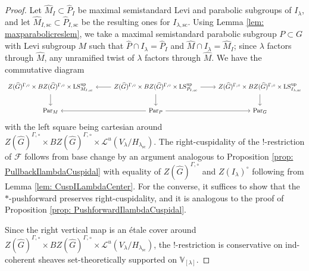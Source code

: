 \documentclass{amsart}
\theoremstyle{definition}
\theoremstyle{remark}
\numberwithin{equation}{section}
\newcommand{\mc}{\mathcal}
\newcommand{\Sc}{\mathrm{sc}}
\newcommand{\wh}{\widehat}
\newcommand{\Par}{\mathrm{Par}}
\newcommand{\V}{\mathbb{V}}
\newcommand{\up}{\mathrm{up}}
\newcommand{\LS}{\mathrm{LS}}
\begin{document}
\begin{proof}
Let $\wh M_{I}\subset \wh P_{I}$ be maximal semistandard Levi and parabolic subgroups of $I_{\lambda}$, and let $\wh M_{I, \Sc}\subset \wh P_{I, \Sc}$ be the resulting ones for $I_{\lambda, \Sc}$. Using Lemma \ref{lem: maxparabolicreslem}, we take a maximal semistandard parabolic subgroup $P\subset G$ with Levi subgroup $M$ such that $\wh P\cap I_\lambda=\wh P_I$ and $\wh M\cap I_\lambda=\wh M_I$; since $\lambda$ factors through $\wh M$, any unramified twist of $\lambda$ factors through $\wh M$. We have the commutative diagram
\[
\begin{tikzcd}
    Z(\wh G)^{\Gamma, \circ}\times BZ(\wh G)^{\Gamma, \circ}\times \LS_{M_{I, \Sc}}^\up \arrow[d] &Z(\wh G)^{\Gamma, \circ}\times BZ(\wh G)^{\Gamma, \circ}\times \LS_{P_{I, \Sc}}^\up \arrow[l] \arrow[d] \arrow[r] & Z(\wh G)^{\Gamma, \circ}\times BZ(\wh G)^{\Gamma, \circ}\times \LS_{I_{\lambda, \Sc}}^\up \arrow[d] \\
    \Par_{M} & \Par_P \arrow[l] \arrow[r] & \Par_{G}
\end{tikzcd}
\]
with the left square being cartesian around $Z(\wh G)^{\Gamma, \circ}\times BZ(\wh G)^{\Gamma, \circ}\times \mc L^u (V_\lambda /H_{\lambda_\Sc})$. The right-cuspidality of the $!$-restriction of $\mc F$ follows from base change by an argument analogous to Proposition \ref{prop: PullbackIlambdaCuspidal} with equality of $Z(\wh{G})^{\Gamma, \circ}$ and $Z(I_{\lambda})^{\circ}$ following from Lemma \ref{lem: CuspILambdaCenter}. For the converse, it suffices to show that the $*$-pushforward preserves right-cuspidality, and it is analogous to the proof of Proposition \ref{prop: PushforwardIlambdaCuspidal}. 

Since the right vertical map is an \'etale cover around $Z(\wh G)^{\Gamma, \circ}\times BZ(\wh G)^{\Gamma, \circ}\times \mc L^u(V_\lambda / H_{\lambda_\Sc})$, the $!$-restriction is conservative on ind-coherent sheaves set-theoretically supported on $\V_{[\lambda]}$. 
\end{proof}
\end{document}

